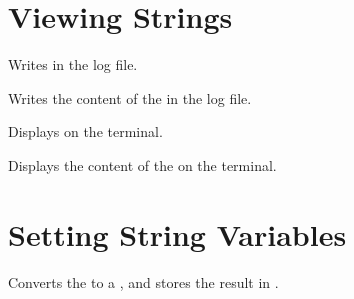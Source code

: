 \documentclass[oneside]{book}
\begin{document}
\section{Viewing Strings}

\begin{function}{\strLog}
\begin{syntax}
 
\end{syntax}
Writes  in the log file.
\begin{codehigh}
\end{codehigh}
\end{function}

\begin{function}{\strVarLog}
\begin{syntax}
 
\end{syntax}
Writes the content of the  in the log file.
\begin{codehigh}
\strSet {}
\strVarLog \lTmpiStr
\end{codehigh}
\end{function}

\begin{function}{\strShow}
\begin{syntax}
 
\end{syntax}
Displays  on the terminal.
\begin{codehigh}
\end{codehigh}
\end{function}

\begin{function}{\strVarShow}
\begin{syntax}
 
\end{syntax}
Displays the content of the  on the terminal.
\begin{codehigh}
\strSet {}
\strVarShow \lTmpiStr
\end{codehigh}
\end{function}

\section{Setting String Variables}

\begin{function}{\strSet}
\begin{syntax}
  
\end{syntax}
Converts the  to a , and stores the
result in .
\begin{demohigh}
\strSet {}
\strUse \lTmpiStr
\end{demohigh}
\end{function}
\end{document}
